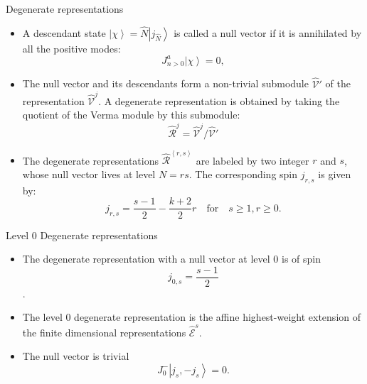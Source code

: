 \documentclass{beamer}
\newcommand{\ket}[1]{\left| #1 \right\rangle}
\newcommand{\vev}[1]{\left\langle #1 \right\rangle}
\begin{document}
\begin{frame}{Degenerate representations}
  \begin{itemize}
    \item A descendant state $\ket{\chi} = \hat{N} \ket{j_{\hat{N}}} $ is called a null vector if it is annihilated by all 
    the positive modes:
      \begin{equation}
          J^{a}_{n>0} \ket{\chi} = 0, \label{nullvectoreq}
      \end{equation}
    \item The null vector and its descendants form a non-trivial submodule $\widehat{\mathcal{V}}'$ of the representation $\widehat{\mathcal{V}}^{j}$.
    A degenerate representation is obtained by taking the quotient of the Verma module by this submodule:
      \begin{equation}
          \widehat{\mathcal{R}}^{j} = \widehat{\mathcal{V}}^{j} / \widehat{\mathcal{V}}'
      \end{equation}
    \item The degenerate representations $\widehat{\mathcal{R}}^{\vev{r,s}}$ are labeled by two integer $r$ and $s$, whose null vector 
      lives at level $N = rs$. The corresponding spin $j_{r,s}$ is given by: 
      \begin{equation}
          j_{r,s} = \frac{s-1}{2} - \frac{k+2}{2} r \quad \mathrm{for} \quad s\geq 1, r \geq 0.
      \end{equation}
  \end{itemize}
\end{frame}

\begin{frame}{Level 0 Degenerate representations}
  \begin{itemize}
    \item The degenerate representation with a null vector at level 0 is of spin 
    \begin{equation}
        j_{0,s} = \frac{s-1}{2}
    \end{equation}. 
    \item The level 0 degenerate representation is the affine highest-weight extension of the finite 
    dimensional representations $\widehat{\mathcal{E}}^{s}$.
    \item The null vector is trivial 
      \begin{equation}
          J^{-}_{0} \ket{j_{s},-j_{s}} = 0.
      \end{equation}
  \end{itemize}
\end{frame}
\end{document}
